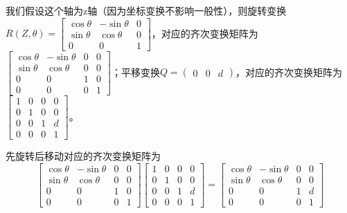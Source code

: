 \documentclass{homework}
\begin{document}
\begin{sol}
  我们假设这个轴为z轴（因为坐标变换不影响一般性），则旋转变换$ R(Z, \theta) = 
  \begin{bmatrix}
    \cos\theta & -\sin\theta & 0 \\
    \sin\theta & \cos\theta & 0 \\
    0 & 0 & 1
  \end{bmatrix} $，对应的齐次变换矩阵为$
  \begin{bmatrix}
    \cos\theta & -\sin\theta & 0 & 0 \\
    \sin\theta & \cos\theta & 0 & 0 \\
    0 & 0 & 1 & 0 \\
    0 & 0 & 0 & 1 
  \end{bmatrix} $；平移变换$ Q = \begin{pmatrix} 0 & 0 & d \end{pmatrix} $，对应的齐次变换矩阵为$
  \begin{bmatrix}
    1 & 0 & 0 & 0 \\
    0 & 1 & 0 & 0 \\
    0 & 0 & 1 & d \\
    0 & 0 & 0 & 1 
  \end{bmatrix} $。

  先旋转后移动对应的齐次变换矩阵为
  \[
    \begin{bmatrix}
      \cos\theta & -\sin\theta & 0 & 0 \\
      \sin\theta & \cos\theta & 0 & 0 \\
      0 & 0 & 1 & 0 \\
      0 & 0 & 0 & 1 
    \end{bmatrix}
    \begin{bmatrix}
      1 & 0 & 0 & 0 \\
      0 & 1 & 0 & 0 \\
      0 & 0 & 1 & d \\
      0 & 0 & 0 & 1 
    \end{bmatrix}
    =
    \begin{bmatrix}
      \cos\theta & -\sin\theta & 0 & 0 \\
      \sin\theta & \cos\theta & 0 & 0 \\
      0 & 0 & 1 & d \\
      0 & 0 & 0 & 1 
    \end{bmatrix}
  \]


\end{sol}
\end{document}
